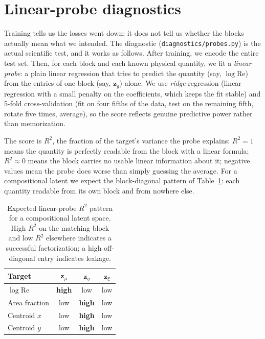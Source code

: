 \documentclass[11pt]{article}
\begin{document}
\section{Linear-probe diagnostics}
\label{sec:diagnostics}

Training tells us the losses went down; it does not tell us whether the
blocks actually mean what we intended. The diagnostic
(\texttt{diagnostics/probes.py}) is the actual scientific test, and it
works as follows. After training, we encode the entire test set. Then,
for each block and each known physical quantity, we fit a \emph{linear
probe}: a plain linear regression that tries to predict the quantity
(say, $\log \mathrm{Re}$) from the entries of one block (say,
$\boldsymbol{z}_{g}$) alone. We use \emph{ridge} regression (linear
regression with a small penalty on the coefficients, which keeps the fit
stable) and 5-fold cross-validation (fit on four fifths of the data, test
on the remaining fifth, rotate five times, average), so the score
reflects genuine predictive power rather than memorization.

The score is $R^2$, the fraction of the target's variance the probe
explains: $R^2 = 1$ means the quantity is perfectly readable from the
block with a linear formula; $R^2 \approx 0$ means the block carries no
usable linear information about it; negative values mean the probe does
worse than simply guessing the average. For a compositional latent we
expect the block-diagonal pattern of Table~\ref{tab:probes}: each
quantity readable from its own block and from nowhere else.

\begin{table}[htbp]
  \centering
  \caption{Expected linear-probe $R^2$ pattern for a compositional latent
  space. High $R^2$ on the matching block and low $R^2$ elsewhere indicates
  a successful factorization; a high off-diagonal entry indicates leakage.}
  \label{tab:probes}
  \begin{tabular}{lccc}
    \toprule
    Target & $\boldsymbol{z}_{\mu}$ & $\boldsymbol{z}_{g}$ & $\boldsymbol{z}_{\xi}$ \\
    \midrule
    $\log \mathrm{Re}$    & \textbf{high} & low           & low \\
    Area fraction         & low           & \textbf{high} & low \\
    Centroid $x$          & low           & \textbf{high} & low \\
    Centroid $y$          & low           & \textbf{high} & low \\
    \bottomrule
  \end{tabular}
\end{table}
\end{document}

